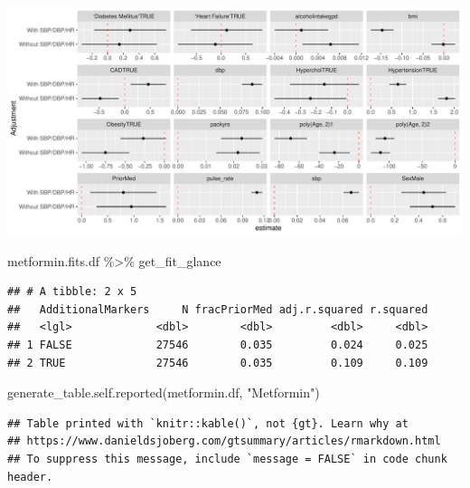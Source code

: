 \documentclass[
]{article}
\newenvironment{Shaded}{\begin{snugshade}}{\end{snugshade}}
\newcommand{\FunctionTok}[1]{\textcolor[rgb]{0.00,0.00,0.00}{#1}}
\newcommand{\NormalTok}[1]{#1}
\newcommand{\SpecialCharTok}[1]{\textcolor[rgb]{0.00,0.00,0.00}{#1}}
\newcommand{\StringTok}[1]{\textcolor[rgb]{0.31,0.60,0.02}{#1}}
\begin{document}
\includegraphics{../results/report_files/figure-latex/metformin-fit-forest-1.pdf}

\begin{Shaded}
\begin{Highlighting}[]
\NormalTok{metformin.fits.df }\SpecialCharTok{\%\textgreater{}\%} 
\NormalTok{  get\_fit\_glance}
\end{Highlighting}
\end{Shaded}

\begin{verbatim}
## # A tibble: 2 x 5
##   AdditionalMarkers     N fracPriorMed adj.r.squared r.squared
##   <lgl>             <dbl>        <dbl>         <dbl>     <dbl>
## 1 FALSE             27546        0.035         0.024     0.025
## 2 TRUE              27546        0.035         0.109     0.109
\end{verbatim}

\begin{Shaded}
\begin{Highlighting}[]
\FunctionTok{generate\_table.self.reported}\NormalTok{(metformin.df, }\StringTok{"Metformin"}\NormalTok{)}
\end{Highlighting}
\end{Shaded}

\begin{verbatim}
## Table printed with `knitr::kable()`, not {gt}. Learn why at
## https://www.danieldsjoberg.com/gtsummary/articles/rmarkdown.html
## To suppress this message, include `message = FALSE` in code chunk header.
\end{verbatim}
\end{document}
